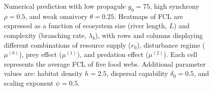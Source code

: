 \begin{figure}
\centering
{}
\caption{\label{fig:fig-num3}Numerical prediction with low propagule
\(g_0 = 75\), high synchrony \(\rho = 0.5\), and weak omnivory
\(\theta = 0.25\). Heatmaps of FCL are expressed as a function of
ecosystem size (river length, \(L\)) and complexity (branching rate,
\(\lambda_b\)), with rows and columns displaying different combinations
of resource supply (\(r_0\)), disturbance regime (\(\mu^{(0)}\)), prey
effect (\(\mu^{(1)}\)), and predation effect (\(\mu^{(2)}\)). Each cell
represents the average FCL of five food webs. Additional parameter
values are: habitat density \(h=2.5\), dispersal capability
\(\delta_0=0.5\), and scaling exponent \(\psi=0.5\).}
\end{figure}

\newpage

